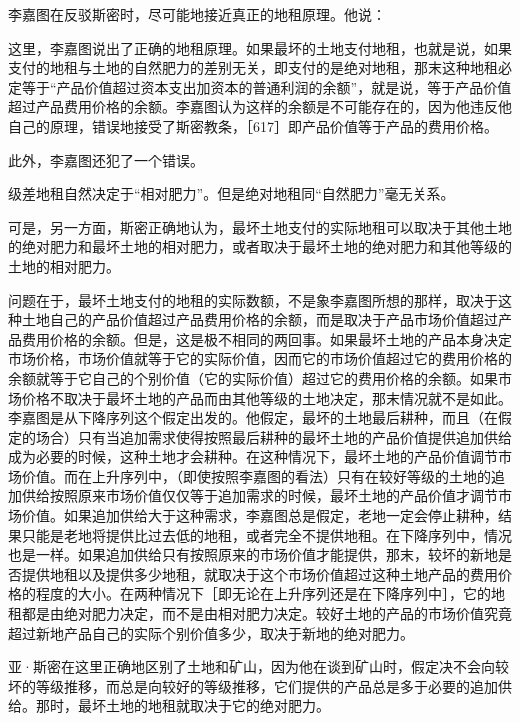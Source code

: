 李嘉图在反驳斯密时，尽可能地接近真正的地租原理。他说：



这里，李嘉图说出了正确的地租原理。如果最坏的土地支付地租，也就是说，如果支付的地租与土地的自然肥力的差别无关，即支付的是绝对地租，那末这种地租必定等于“产品价值超过资本支出加资本的普通利润的余额”，就是说，等于产品价值超过产品费用价格的余额。李嘉图认为这样的余额是不可能存在的，因为他违反他自己的原理，错误地接受了斯密教条，［617］即产品价值等于产品的费用价格。

此外，李嘉图还犯了一个错误。

级差地租自然决定于“相对肥力”。但是绝对地租同“自然肥力”毫无关系。

可是，另一方面，斯密正确地认为，最坏土地支付的实际地租可以取决于其他土地的绝对肥力和最坏土地的相对肥力，或者取决于最坏土地的绝对肥力和其他等级的土地的相对肥力。

问题在于，最坏土地支付的地租的实际数额，不是象李嘉图所想的那样，取决于这种土地自己的产品价值超过产品费用价格的余额，而是取决于产品市场价值超过产品费用价格的余额。但是，这是极不相同的两回事。如果最坏土地的产品本身决定市场价格，市场价值就等于它的实际价值，因而它的市场价值超过它的费用价格的余额就等于它自己的个别价值（它的实际价值）超过它的费用价格的余额。如果市场价格不取决于最坏土地的产品而由其他等级的土地决定，那末情况就不是如此。李嘉图是从下降序列这个假定出发的。他假定，最坏的土地最后耕种，而且（在假定的场合）只有当追加需求使得按照最后耕种的最坏土地的产品价值提供追加供给成为必要的时候，这种土地才会耕种。在这种情况下，最坏土地的产品价值调节市场价值。而在上升序列中，（即使按照李嘉图的看法）只有在较好等级的土地的追加供给按照原来市场价值仅仅等于追加需求的时候，最坏土地的产品价值才调节市场价值。如果追加供给大于这种需求，李嘉图总是假定，老地一定会停止耕种，结果只能是老地将提供比过去低的地租，或者完全不提供地租。在下降序列中，情况也是一样。如果追加供给只有按照原来的市场价值才能提供，那末，较坏的新地是否提供地租以及提供多少地租，就取决于这个市场价值超过这种土地产品的费用价格的程度的大小。在两种情况下［即无论在上升序列还是在下降序列中］，它的地租都是由绝对肥力决定，而不是由相对肥力决定。较好土地的产品的市场价值究竟超过新地产品自己的实际个别价值多少，取决于新地的绝对肥力。

亚·斯密在这里正确地区别了土地和矿山，因为他在谈到矿山时，假定决不会向较坏的等级推移，而总是向较好的等级推移，它们提供的产品总是多于必要的追加供给。那时，最坏土地的地租就取决于它的绝对肥力。



